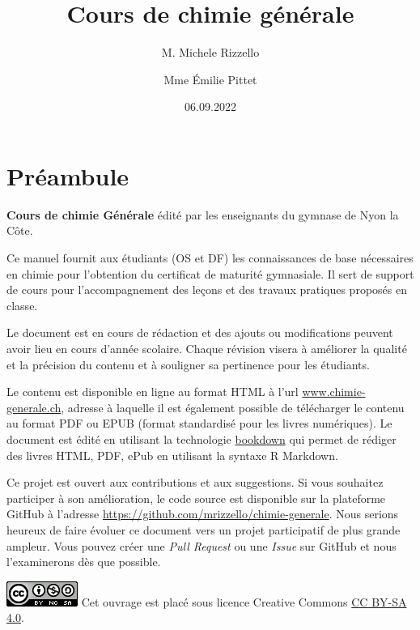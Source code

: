 \documentclass[
  11pt,
  french,
  a4paper,
  openany]{book}
\title{Cours de chimie générale}
\author{M. Michele Rizzello \and Mme Émilie Pittet}
\date{06.09.2022}
\begin{document}
\maketitle

{
\setcounter{tocdepth}{1}
\tableofcontents
}
\hypertarget{pruxe9ambule}{%
\chapter*{Préambule}\label{pruxe9ambule}}

\textbf{Cours de chimie Générale} édité par les enseignants du gymnase de Nyon la Côte.

Ce manuel fournit aux étudiants (OS et DF) les connaissances de base nécessaires en chimie pour l'obtention du certificat de maturité gymnasiale. Il sert de support de cours pour l'accompagnement des leçons et des travaux pratiques proposés en classe.

Le document est en cours de rédaction et des ajouts ou modifications peuvent avoir lieu en cours d'année scolaire. Chaque révision visera à améliorer la qualité et la précision du contenu et à souligner sa pertinence pour les étudiants.

Le contenu est disponible en ligne au format HTML à l'url \url{www.chimie-generale.ch}, adresse à laquelle il est également possible de télécharger le contenu au format PDF ou EPUB (format standardisé pour les livres numériques). Le document est édité en utilisant la technologie \href{https://bookdown.org/}{bookdown} qui permet de rédiger des livres HTML, PDF, ePub en utilisant la syntaxe R Markdown.

Ce projet est ouvert aux contributions et aux suggestions. Si vous souhaitez participer à son amélioration, le code source est disponible sur la plateforme GitHub à l'adresse \url{https://github.com/mrizzello/chimie-generale}. Nous serions heureux de faire évoluer ce document vers un projet participatif de plus grande ampleur. Vous pouvez créer une \emph{Pull Request} ou une \emph{Issue} sur GitHub et nous l'examinerons dès que possible.


\includegraphics{images/by-nc-sa.png}
Cet ouvrage est placé sous licence Creative Commons \href{https://creativecommons.org/licenses/by-sa/4.0/deed.fr}{CC BY-SA 4.0}.
\end{document}
